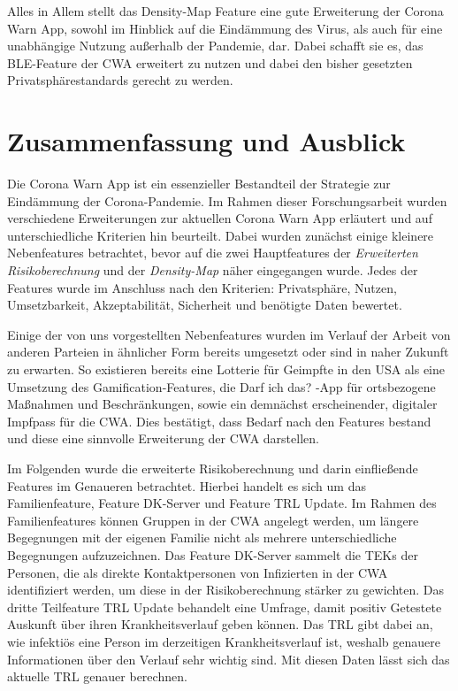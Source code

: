 \documentclass[conference,compsoc]{IEEEtran}
\begin{document}
Alles in Allem stellt das Density-Map Feature eine gute Erweiterung der Corona Warn App, sowohl im Hinblick auf die Eindämmung des Virus, als auch für eine unabhängige Nutzung außerhalb der Pandemie, dar.
Dabei schafft sie es, das BLE-Feature der CWA erweitert zu nutzen und dabei den bisher gesetzten Privatsphärestandards gerecht zu werden. 

\section{Zusammenfassung und Ausblick} \label{Conclusion}
Die Corona Warn App ist ein essenzieller Bestandteil der Strategie zur Eindämmung der Corona-Pandemie. 
Im Rahmen dieser Forschungsarbeit wurden verschiedene Erweiterungen zur aktuellen Corona Warn App erläutert und auf unterschiedliche Kriterien hin beurteilt. 
Dabei wurden zunächst einige kleinere Nebenfeatures betrachtet, bevor auf die zwei Hauptfeatures der \textit{Erweiterten Risikoberechnung} und der \textit{Density-Map} näher eingegangen wurde. 
Jedes der Features wurde im Anschluss nach den Kriterien: Privatsphäre, Nutzen, Umsetzbarkeit, Akzeptabilität, Sicherheit und benötigte Daten bewertet. 

Einige der von uns vorgestellten Nebenfeatures wurden im Verlauf der Arbeit von anderen Parteien in ähnlicher Form bereits umgesetzt oder sind in naher Zukunft zu erwarten.
So existieren bereits eine Lotterie für Geimpfte in den USA als eine Umsetzung des Gamification-Features, 
die \glqq Darf ich das? \grqq -App für ortsbezogene Maßnahmen und Beschränkungen, 
sowie ein demnächst erscheinender, digitaler Impfpass für die CWA. 
Dies bestätigt, dass Bedarf nach den Features bestand und diese eine sinnvolle Erweiterung der CWA darstellen.

Im Folgenden wurde die erweiterte Risikoberechnung und darin einfließende Features im Genaueren betrachtet. 
Hierbei handelt es sich um das Familienfeature, Feature DK-Server und Feature TRL Update. 
Im Rahmen des Familienfeatures können Gruppen in der CWA angelegt werden, um längere Begegnungen mit der eigenen Familie nicht als mehrere unterschiedliche Begegnungen aufzuzeichnen. 
Das Feature DK-Server sammelt die TEKs der Personen, die als direkte Kontaktpersonen von Infizierten in der CWA identifiziert werden, um diese in der Risikoberechnung stärker zu gewichten. 
Das dritte Teilfeature TRL Update behandelt eine Umfrage, damit positiv Getestete Auskunft über ihren Krankheitsverlauf geben können.
Das TRL gibt dabei an, wie infektiös eine Person im derzeitigen Krankheitsverlauf ist, weshalb genauere Informationen über den Verlauf sehr wichtig sind.
Mit diesen Daten lässt sich das aktuelle TRL genauer berechnen.
\end{document}

